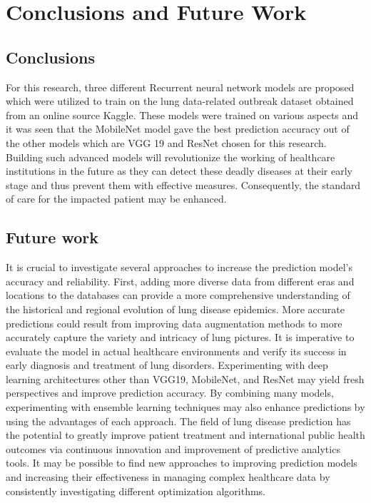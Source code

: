 \chapter{Conclusions and Future Work}
\label{ch:con}
\section{Conclusions}
For this research, three different Recurrent neural network models are proposed which were utilized to train on the lung data-related outbreak dataset obtained from an online source Kaggle. These models were trained on various aspects and it was seen that the MobileNet model gave the best prediction accuracy out of the other models which are VGG 19 and ResNet chosen for this research. Building such advanced models will revolutionize the working of healthcare institutions in the future as they can detect these deadly diseases at their early stage and thus prevent them with effective measures. Consequently, the standard of care for the impacted patient may be enhanced. 

\section{Future work}
It is crucial to investigate several approaches to increase the prediction model's accuracy and reliability. First, adding more diverse data from different eras and locations to the databases can provide a more comprehensive understanding of the historical and regional evolution of lung disease epidemics. More accurate predictions could result from improving data augmentation methods to more accurately capture the variety and intricacy of lung pictures. It is imperative to evaluate the model in actual healthcare environments and verify its success in early diagnosis and treatment of lung disorders. Experimenting with deep learning architectures other than VGG19, MobileNet, and ResNet may yield fresh perspectives and improve prediction accuracy. By combining many models, experimenting with ensemble learning techniques may also enhance predictions by using the advantages of each approach.  The field of lung disease prediction has the potential to greatly improve patient treatment and international public health outcomes via continuous innovation and improvement of predictive analytics tools. It may be possible to find new approaches to improving prediction models and increasing their effectiveness in managing complex healthcare data by consistently investigating different optimization algorithms.